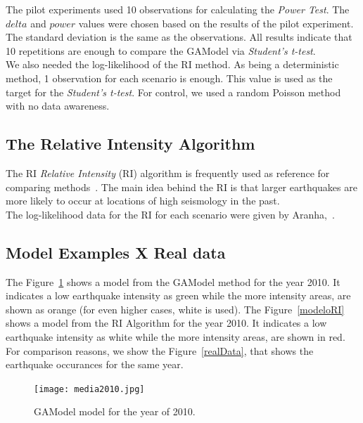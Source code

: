 The pilot experiments used 10 observations for calculating the {\it Power Test}. The $delta$ and $power$ values were chosen based on the results of the pilot experiment. The standard deviation is the same as the observations. All results indicate that 10 repetitions are enough to compare the GAModel via {\it Student's t-test}.\\

We also needed the log-likelihood of the RI method. As being a deterministic method, 1 observation for each scenario is enough. This value is used as the target for the {\it Student's t-test}. For control, we used a random Poisson method with no data awareness.\\

\subsection{The Relative Intensity Algorithm}\label{ri}
The RI {\it Relative Intensity} (RI) algorithm is frequently used as reference for comparing methods~\cite{Nanjo2011}. The main idea behind the RI is that larger earthquakes are more likely to occur at locations of high seismology in the past.\\
	
The log-likelihood data for the RI for each scenario were given by Aranha,~\cite{ecta14}.\\



\subsection{Model Examples X Real data}
	
The Figure~\ref{modeloGAModel} shows a model from the GAModel method for the year 2010. It indicates a low earthquake intensity as green while the more intensity areas, are shown as orange (for even higher cases, white is used). The Figure~\ref{modeloRI} shows a model from the RI Algorithm for the year 2010. It indicates a low earthquake intensity as white while the more intensity areas, are shown in red. For comparison reasons, we show the Figure~\ref{realData}, that shows the earthquake occurances for the same year.\\

\begin{figure}[H]
\centering
\texttt{[image: media2010.jpg]}
\caption{ GAModel model for the year of 2010.}
\label{modeloGAModel}
\end{figure}

